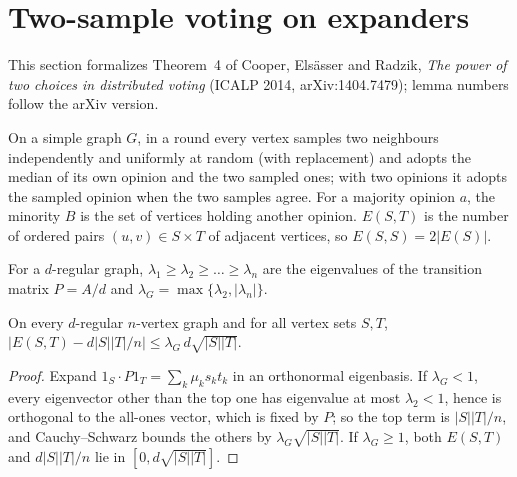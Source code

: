 \section{Two-sample voting on expanders}\label{sec:cer-two-choices}
This section formalizes Theorem~4 of Cooper, Elsässer and Radzik, \emph{The power of two choices
in distributed voting} (ICALP 2014, arXiv:1404.7479); lemma numbers follow the arXiv version.

\begin{definition}\label{def:graph-voting}
\leanok{}
On a simple graph $G$, in a round every vertex samples two neighbours independently and uniformly
at random (with replacement) and adopts the median of its own opinion and the two sampled ones;
with two opinions it adopts the sampled opinion when the two samples agree. For a majority
opinion $a$, the minority $B$ is the set of vertices holding another opinion. $E(S,T)$ is the
number of ordered pairs $(u,v)\in S\times T$ of adjacent vertices, so $E(S,S)=2|E(S)|$.
\end{definition}

\begin{definition}\label{def:lambdaG}
\leanok
For a $d$-regular graph, $\lambda_1\ge\lambda_2\ge\dots\ge\lambda_n$ are the eigenvalues of the
transition matrix $P=A/d$ and $\lambda_G=\max\{\lambda_2,|\lambda_n|\}$.
\end{definition}

\begin{lemma}\label{lem:eml}
\leanok{}
On every $d$-regular $n$-vertex graph and for all vertex sets $S,T$,
$|E(S,T)-d|S||T|/n|\le\lambda_G\,d\sqrt{|S||T|}$.
\end{lemma}
\begin{proof}\leanok
Expand $1_S\cdot P1_T=\sum_k\mu_k s_kt_k$ in an orthonormal eigenbasis. If $\lambda_G<1$, every
eigenvector other than the top one has eigenvalue at most $\lambda_2<1$, hence is orthogonal to
the all-ones vector, which is fixed by $P$; so the top term is $|S||T|/n$, and Cauchy--Schwarz
bounds the others by $\lambda_G\sqrt{|S||T|}$. If $\lambda_G\ge1$, both $E(S,T)$ and $d|S||T|/n$
lie in $[0,d\sqrt{|S||T|}]$.
\end{proof}

